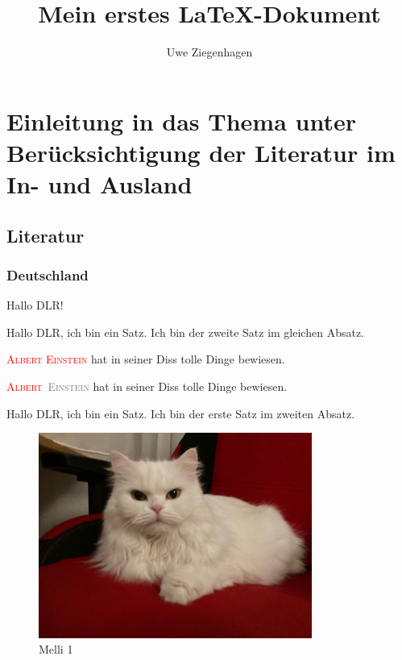 \documentclass[12pt,ngerman,parskip=half]{scrartcl}
\author{Uwe Ziegenhagen}
\title{Mein erstes LaTeX-Dokument}
\newcommand{\person}[1]{\textsc{\textcolor{red}{#1}}}
\newcommand{\Person}[2]{\textsc{\textcolor{red}{#1}~\textcolor{gray}{#2}}}
\begin{document}
\maketitle

\tableofcontents


\listoffigures

\section[Einleitung und Überblick]{Einleitung in das Thema unter Berücksichtigung der Literatur im In- und Ausland}\label{sec:Einleitung}
\subsection{Literatur}

\subsubsection{Deutschland}

Hallo DLR!

Hallo DLR, ich bin ein Satz. Ich bin der zweite Satz im gleichen Absatz.

\person{Albert Einstein} hat in seiner Diss tolle Dinge bewiesen. 

\Person{Albert}{Einstein} hat in seiner Diss tolle Dinge bewiesen. 

Hallo DLR, ich bin ein Satz.  Ich bin der erste Satz im zweiten Absatz.

\begin{figure}
\begin{center}
\includegraphics[width=0.8\textwidth]{Bilder/Katze}
\caption{Melli 1}\label{fig:Katze}
\end{center}
\end{figure}
\end{document}
